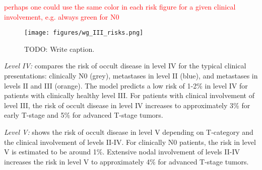 \documentclass[twocolumn]{aastex631}
\newcommand{\ju}[1]{{\textcolor{red}{#1}}}
\begin{document}
\ju{perhaps one could use the same color in each risk figure for a given clinical involvement, e.g. always green for N0}

\begin{figure}
    \begin{centering}
        \texttt{[image: figures/wg\_III\_risks.png]}
        \caption{TODO: Write caption.}
        \label{fig:wg_III_risks}
    \end{centering}
\end{figure}

{\it Level IV:}  compares the risk of occult disease in level IV for the typical clinical presentations: clinically N0 (grey), metastases in level II (blue), and metastases in levels II and III (orange). The model predicts a low risk of 1-2\% in level IV for patients with clinically healthy level III. For patients with clinical involvement of level III, the risk of occult disease in level IV increases to approximately 3\% for early T-stage and 5\% for advanced T-stage tumors.

\begin{figure}
\end{figure}

{\it Level V:}  shows the risk of occult disease in level V depending on T-category and the clinical involvement of levels II-IV. For clinically N0 patients, the risk in level V is estimated to be around 1\%. Extensive nodal involvement of levels II-IV increases the risk in level V to approximately 4\% for advanced T-stage tumors. 
\end{document}
